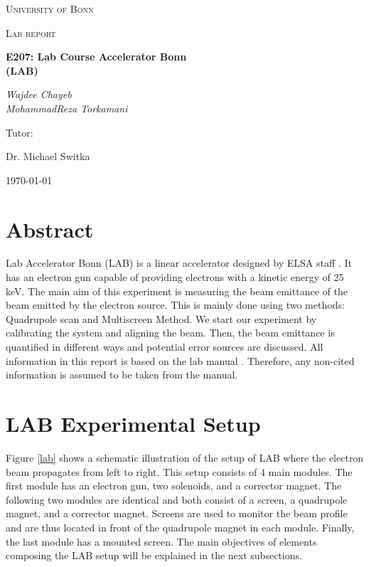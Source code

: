 \documentclass[12pt]{article}
\begin{document}
\begin{titlepage}
	\centering
	{\textsc{University of Bonn} \par}
	\vspace{1cm}
	{\Large \textsc{Lab report}\par}
	\vspace{1.5cm}
	{\huge\bfseries  E207: Lab Course Accelerator Bonn 
            \\(LAB)\par}
	\vspace{2cm}
	{\Large\itshape Wajdee Chayeb \\
	MohammadReza Torkamani\par}
	\vfill
	Tutor:\par
	Dr. Michael Switka

	\vfill

	{\large \today\par}
\end{titlepage}

\tableofcontents

\section{Abstract}


Lab Accelerator Bonn (LAB) is a linear accelerator designed by ELSA staff \cite{elsa}. It has an electron gun capable of providing electrons with a kinetic energy of 25 keV. The main aim of this experiment is measuring the beam emittance of the beam emitted by the electron source. This is mainly done using two methods: Quadrupole scan and Multiscreen Method. We start our experiment by calibrating the system and aligning the beam. Then, the beam emittance is quantified in different ways and potential error sources are discussed. All information in this report is based on the lab manual \cite{lecturenote}. Therefore, any non-cited information is assumed to be taken from the manual. 

\section{LAB Experimental Setup}
Figure \ref{lab} shows a schematic illustration of the setup of LAB where the electron beam propagates from left to right. This setup consists of 4 main modules. The first module has an electron gun, two solenoids, and a corrector magnet.  The following two modules are identical and both consist of a screen, a quadrupole magnet, and a corrector magnet. Screens are used to monitor the beam profile and are thus located in front of the quadrupole magnet in each module. Finally, the last module has a mounted screen. The main objectives of elements composing the LAB setup will be explained in the next subsections.
\end{document}

